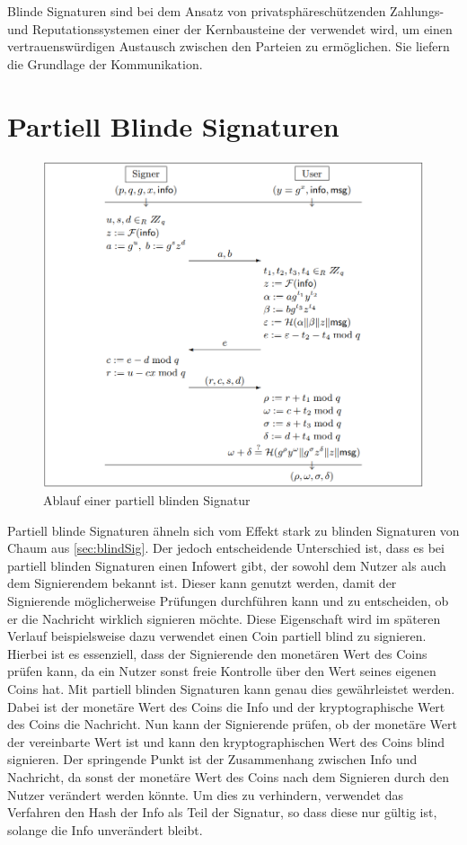 \documentclass{scrreprt}
\begin{document}
Blinde Signaturen sind bei dem Ansatz von privatsphäreschützenden Zahlungs- und Reputationssystemen einer der Kernbausteine der verwendet wird, um einen vertrauenswürdigen Austausch zwischen den Parteien zu ermöglichen. Sie liefern die Grundlage der Kommunikation.

\section{Partiell Blinde Signaturen}
\label{sec:partBlindSig}
\begin{figure}[h]
    \label{fig:partBlindSig}
    \centering
    \includegraphics*[width=1\textwidth]{partBlindSig.png}
    \caption{Ablauf einer partiell blinden Signatur \cite{abe2000provably}}
\end{figure}
Partiell blinde Signaturen ähneln sich vom Effekt stark zu blinden Signaturen von Chaum aus \ref{sec:blindSig}. Der jedoch entscheidende Unterschied ist, dass es bei partiell blinden Signaturen einen Infowert gibt, der sowohl dem Nutzer als auch dem Signierendem bekannt ist. Dieser kann genutzt werden, damit der Signierende möglicherweise Prüfungen durchführen kann und zu entscheiden, ob er die Nachricht wirklich signieren möchte. Diese Eigenschaft wird im späteren Verlauf beispielsweise dazu verwendet einen Coin partiell blind zu signieren. Hierbei ist es essenziell, dass der Signierende den monetären Wert des Coins prüfen kann, da ein Nutzer sonst freie Kontrolle über den Wert seines eigenen Coins hat. Mit partiell blinden Signaturen kann genau dies gewährleistet werden. Dabei ist der monetäre Wert des Coins die Info und der kryptographische Wert des Coins die Nachricht. Nun kann der Signierende prüfen, ob der monetäre Wert der vereinbarte Wert ist und kann den kryptographischen Wert des Coins blind signieren. Der springende Punkt ist der Zusammenhang zwischen Info und Nachricht, da sonst der monetäre Wert des Coins nach dem Signieren durch den Nutzer verändert werden könnte. Um dies zu verhindern, verwendet das Verfahren den Hash der Info als Teil der Signatur, so dass diese nur gültig ist, solange die Info unverändert bleibt.
\end{document}
